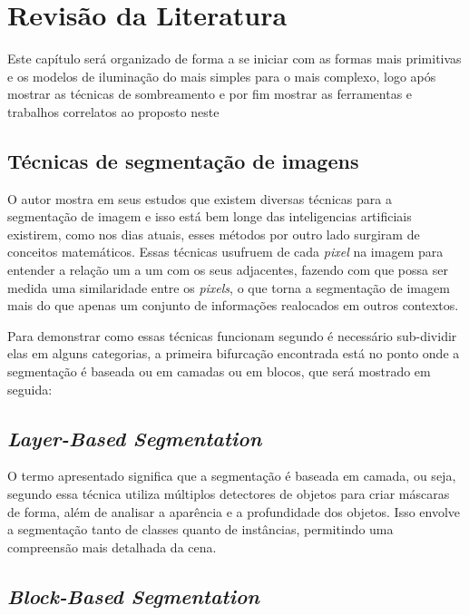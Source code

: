 \chapter{Revisão da Literatura}
\label{cap:02}

Este capítulo será organizado de forma a se iniciar com as formas mais primitivas e os modelos de iluminação do mais simples para o mais complexo, logo após mostrar as técnicas de sombreamento e por fim mostrar as ferramentas e trabalhos correlatos ao proposto neste

\section{Técnicas de segmentação de imagens}

O autor   mostra em seus estudos que existem diversas técnicas para a segmentação de imagem e isso está bem longe das inteligencias artificiais existirem, como nos dias atuais, esses métodos por outro lado surgiram de conceitos matemáticos.
Essas técnicas usufruem de cada \textit{pixel} na imagem para entender a relação um a um com os seus adjacentes, fazendo com que possa ser medida uma similaridade entre os \textit{pixels}, 
o que torna a segmentação de imagem mais do que apenas um conjunto de informações realocados em outros contextos.

Para demonstrar como essas técnicas funcionam segundo  é necessário sub-dividir elas em alguns categorias, a primeira bifurcação encontrada está no ponto onde a segmentação é baseada ou em camadas ou em blocos, que será mostrado em seguida:
\section{\textit{Layer-Based Segmentation}}

O termo apresentado significa que a segmentação é baseada em camada, ou seja, segundo   essa técnica utiliza múltiplos detectores de objetos para criar máscaras de forma, além de analisar a aparência e a profundidade dos objetos. 
Isso envolve a segmentação tanto de classes quanto de instâncias, permitindo uma compreensão mais detalhada da cena. 

\section{\textit{Block-Based Segmentation}}

